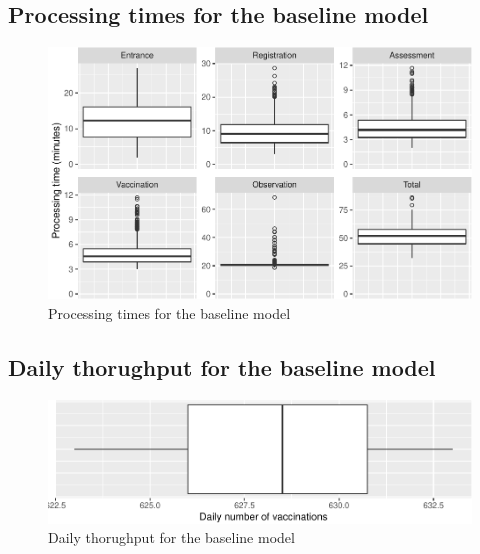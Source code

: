 \documentclass{article}
\begin{document}
\hypertarget{processing-times-for-the-baseline-model}{%
\subsection{Processing times for the baseline
model}\label{processing-times-for-the-baseline-model}}

\begin{figure}[h]

{\centering \includegraphics{Preprint_files/figure-latex/processingTimes-1} 

}

\caption{Processing times for the baseline model}\label{fig:processingTimes}
\end{figure}

\hypertarget{daily-thorughput-for-the-baseline-model}{%
\subsection{Daily thorughput for the baseline
model}\label{daily-thorughput-for-the-baseline-model}}

\begin{figure}[h]

{\centering \includegraphics{Preprint_files/figure-latex/dailyThroughput-1} 

}

\caption{Daily thorughput for the baseline model}\label{fig:dailyThroughput}
\end{figure}
\end{document}
